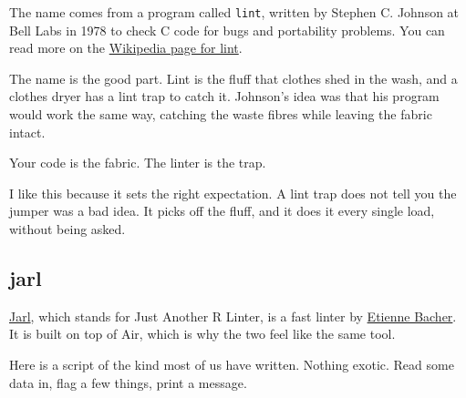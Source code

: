 \documentclass[
  letterpaper,
  justified,
  a4paper]{tufte-book}
\begin{document}
\begin{tcolorbox}[enhanced jigsaw, arc=.35mm, bottomrule=.15mm, bottomtitle=1mm, breakable, colback=white, colbacktitle=quarto-callout-caution-color!10!white, colframe=quarto-callout-caution-color-frame, coltitle=black, left=2mm, leftrule=.75mm, opacityback=0, opacitybacktitle=0.6, rightrule=.15mm, title=\textcolor{quarto-callout-caution-color}{\faFire}\hspace{0.5em}{Some history: why is it called a linter?}, titlerule=0mm, toprule=.15mm, toptitle=1mm]

The name comes from a program called \texttt{lint}, written by Stephen
C. Johnson at Bell Labs in 1978 to check C code for bugs and portability
problems. You can read more on the
\href{https://en.wikipedia.org/wiki/Lint_(software)}{Wikipedia page for
lint}.

The name is the good part. Lint is the fluff that clothes shed in the
wash, and a clothes dryer has a lint trap to catch it. Johnson's idea
was that his program would work the same way, catching the waste fibres
while leaving the fabric intact.

Your code is the fabric. The linter is the trap.

I like this because it sets the right expectation. A lint trap does not
tell you the jumper was a bad idea. It picks off the fluff, and it does
it every single load, without being asked.

\end{tcolorbox}

\subsection{jarl}\label{jarl}

\href{https://jarl.etiennebacher.com/}{Jarl}, which stands for Just
Another R Linter, is a fast linter by
\href{https://www.etiennebacher.com/}{Etienne Bacher}. It is built on
top of Air, which is why the two feel like the same tool.

Here is a script of the kind most of us have written. Nothing exotic.
Read some data in, flag a few things, print a message.
\end{document}

